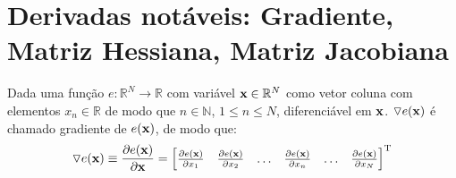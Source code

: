 \section{Derivadas notáveis: Gradiente, Matriz Hessiana, Matriz Jacobiana}

\begin{proposition}\label{def:gradient}
 Dada uma função $e:\mathbb{R}^{N}\rightarrow \mathbb{R}$ com variável $\VECTOR{x} \in \mathbb{R}^{N}$
 como vetor coluna com elementos $x_n\in \mathbb{R}$ de modo que $n\in \mathbb{N}$, $1 \leq n \leq N$,
 diferenciável em $\VECTOR{x}$. 
 $\triangledown e(\VECTOR{x})$ é chamado gradiente 
\cite[pp. 913]{stewart2008calculus} \cite[pp. 80]{telles2015matematica} \cite{Gradient}  de $e(\VECTOR{x})$, de modo que: 
 \begin{equation}
  \triangledown e(\VECTOR{x})\equiv \frac{\partial e(\VECTOR{x})}{\partial \VECTOR{x} }=
\left[
\begin{matrix}
\frac{\partial e(\VECTOR{x}) }{\partial x_{1}}&
\frac{\partial e(\VECTOR{x}) }{\partial x_{2}}&
\hdots&
\frac{\partial e(\VECTOR{x}) }{\partial x_{n}}&
\hdots&
\frac{\partial e(\VECTOR{x}) }{\partial x_{N}}
\end{matrix}
\right]^{\transpose}
 \end{equation}
\end{proposition}


